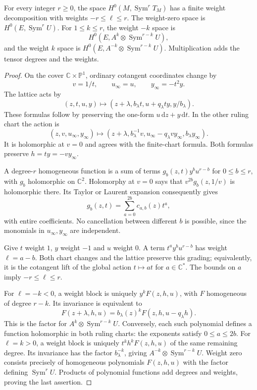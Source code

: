 \begin{lemma}\label{lem:split-elliptic-tensor-weights}
For every integer $r\geq0$, the space $H^0(M,\operatorname{Sym}^rT_M)$ has a finite weight decomposition with weights $-r\leq\ell\leq r$. The weight-zero space is $H^0(E,\operatorname{Sym}^rU)$. For $1\leq k\leq r$, the weight $-k$ space is
\[
 H^0(E,A^k\otimes\operatorname{Sym}^{r-k}U),
\]
and the weight $k$ space is $H^0(E,A^{-k}\otimes\operatorname{Sym}^{r-k}U)$. Multiplication adds the tensor degrees and the weights.
\end{lemma}
\begin{proof}
On the cover $\mathbb C\times\mathbb P^1$, ordinary cotangent coordinates change by
\[
 v=1/t,\qquad u_\infty=u,\qquad y_\infty=-t^2y.
\]
The lattice acts by
\[
 (z,t,u,y)\longmapsto
 (z+\lambda,b_\lambda t,u+q_\lambda ty,y/b_\lambda).
\]
These formulas follow by preserving the one-form $u\,\mathrm{d}z+y\,\mathrm{d}t$. In the other ruling chart the action is
\[
 (z,v,u_\infty,y_\infty)\longmapsto
 (z+\lambda,b_\lambda^{-1}v,
 u_\infty-q_\lambda v y_\infty,b_\lambda y_\infty).
\]
It is holomorphic at $v=0$ and agrees with the finite-chart formula. Both formulas preserve $h=ty=-v y_\infty$.

A degree-$r$ homogeneous function is a sum of terms $g_b(z,t)y^bu^{r-b}$ for $0\leq b\leq r$, with $g_b$ holomorphic on $\mathbb C^2$. Holomorphy at $v=0$ says that $v^{2b}g_b(z,1/v)$ is holomorphic there. Its Taylor or Laurent expansion consequently gives
\[
 g_b(z,t)=\sum_{a=0}^{2b}c_{a,b}(z)t^a,
\]
with entire coefficients. No cancellation between different $b$ is possible, since the monomials in $u_\infty,y_\infty$ are independent.

Give $t$ weight $1$, $y$ weight $-1$ and $u$ weight $0$. A term $t^ay^bu^{r-b}$ has weight $\ell=a-b$. Both chart changes and the lattice preserve this grading; equivalently, it is the cotangent lift of the global action $t\mapsto at$ for $a\in\mathbb C^*$. The bounds on $a$ imply $-r\leq\ell\leq r$.

For $\ell=-k<0$, a weight block is uniquely $y^kF(z,h,u)$, with $F$ homogeneous of degree $r-k$. Its invariance is equivalent to
\[
 F(z+\lambda,h,u)
       =b_\lambda(z)^kF(z,h,u-q_\lambda h).
\]
This is the factor for $A^k\otimes\operatorname{Sym}^{r-k}U$. Conversely, each such polynomial defines a function holomorphic in both ruling charts: the exponents satisfy $0\leq a\leq2b$. For $\ell=k>0$, a weight block is uniquely $t^kh^kF(z,h,u)$ of the same remaining degree. Its invariance has the factor $b_\lambda^{-k}$, giving $A^{-k}\otimes\operatorname{Sym}^{r-k}U$. Weight zero consists precisely of homogeneous polynomials $F(z,h,u)$ with the factor defining $\operatorname{Sym}^rU$. Products of polynomial functions add degrees and weights, proving the last assertion.
\end{proof}

